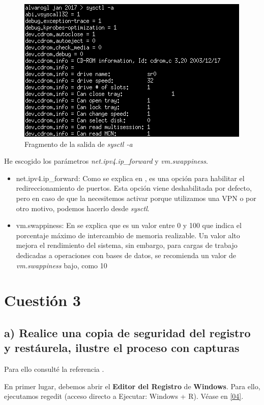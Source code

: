 \begin{figure}[H]
	\centering
	\includegraphics[scale=0.6]{03.png}
	\caption{Fragmento de la salida de \textit{sysctl -a}} \label{03}
\end{figure}

He escogido los parámetros \textit{net.ipv4.ip\_forward} y \textit{vm.swappiness}.

\begin{itemize}
\item{net.ipv4.ip\_forward: Como se explica en \cite{packetforward}, es una opción para habilitar el redireccionamiento de puertos. Esta opción viene deshabilitada por defecto, pero en caso de que la necesitemos activar porque utilizamos una VPN o por otro motivo, podemos hacerlo desde \textit{sysctl}.}
\item{vm.swappiness: En \cite{swap} se explica que es un valor entre 0 y 100 que indica el porcentaje máximo de intercambio de memoria realizable. Un valor alto mejora el rendimiento del sistema, sin embargo, para cargas de trabajo dedicadas a operaciones con bases de datos, se recomienda un valor de \textit{vm.swappiness} bajo, como 10}
\end{itemize}

\section{Cuestión 3}

\subsection{a) Realice una copia de seguridad del registro y restáurela, ilustre el proceso con capturas}

Para ello consulté la referencia \cite{backupreg}.

En primer lugar, debemos abrir el \textbf{Editor del Registro} de \textbf{Windows}. Para ello, ejecutamos regedit (acceso directo a Ejecutar: Windows + R). Véase en \ref{04}.

